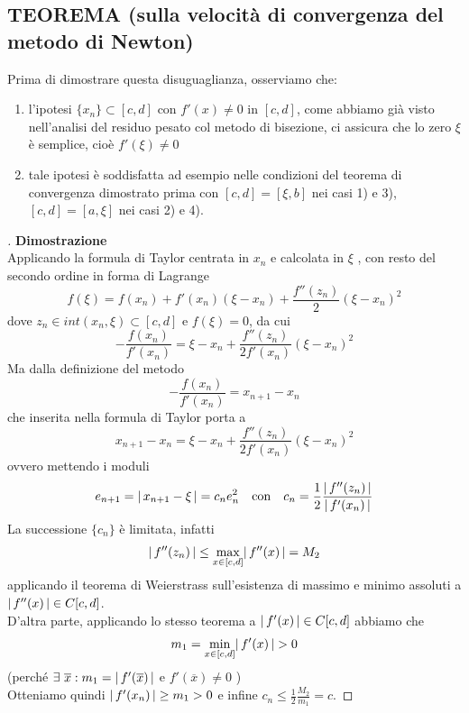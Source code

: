 \documentclass[12pt]{article}
\DeclarePairedDelimiter{\abs}{\lvert}{\rvert}
\begin{document}
\subsection{TEOREMA (sulla velocità di convergenza del metodo di Newton)}
\begin{center}
\end{center}
Prima di dimostrare questa disuguaglianza, osserviamo che:
\begin{enumerate}[label=\roman*)]
\item l'ipotesi $\{x_n\} \subset [c,d]$ con $f'(x)\neq0$ in $[c,d]$, come abbiamo già visto nell'analisi del residuo pesato col metodo di bisezione, ci assicura che lo zero $\xi$ è semplice, cioè $f'(\xi) \neq 0$

\item tale ipotesi è soddisfatta ad esempio nelle condizioni del teorema di convergenza dimostrato prima con $[c,d] = [\xi, b]$ nei casi 1) e 3), $[c,d] = [a,\xi]$ nei casi 2) e 4).
\end{enumerate}

\begin{proof}[\unskip\nopunct]
\textbf{Dimostrazione}\\
Applicando la formula di Taylor centrata in $x_n$ e calcolata in $\xi $ , con resto del secondo ordine in forma di Lagrange
\[f(\xi)=f(x_n)+f'(x_n)(\xi-x_n)+\frac{f''(z_n)}{2}(\xi-x_n)^2\]
dove $z_n\in int(x_n,\xi)\subset [c,d]$ e $f(\xi)=0$, da cui 
\[-\frac{f(x_n)}{f'(x_n)}=\xi-x_n+\frac{f''(z_n)}{2f'(x_n)}(\xi-x_n)^2\]
Ma dalla definizione del metodo
\[-\frac{f(x_n)}{f'(x_n)}=x_{n+1}-x_n\]
che inserita nella formula di Taylor porta a 
\[x_{n+1}-x_n=\xi-x_n+\frac{f''(z_n)}{2f'(x_n)}(\xi-x_n)^2\]
ovvero mettendo i moduli
\[e_{n+1}=\abs{\,x_{n+1}-\xi\,}=c_ne_n^2 \quad \text{con} \quad c_n=\frac{1}{2}\frac{\abs{\,f''(z_n)\,}}{\abs{\,f'(x_n)\,}}\]
La successione $\{c_n\}$ è limitata, infatti 
\[\abs{\,f''(z_n)\,}\leq \max_{x \in [c,d]}\abs{\,f''(x)\,}=M_2\]
applicando il teorema di Weierstrass sull'esistenza di massimo e minimo assoluti a $ \abs{\,f''(x)\,}\in C[c,d]$.\\
D'altra parte, applicando lo stesso teorema a  $ \abs{\,f'(x)\,}\in C[c,d]$ abbiamo che 
\[m_1=\min_{x \in [c,d]}\abs{\,f'(x)\,}>0\] 
(perché $\exists \ \overline{x}: m_1=\abs{\,f'(\overline{x})\,} $  e    $f'(\overline{x})\neq 0$   )\\
Otteniamo quindi $\abs{\,f'(x_n)\,}\geq m_1>0$ e infine $c_n \leq \frac{1}{2}\frac{M_2}{m_1}=c$. 
\newline 
\end{proof}
\end{document}
